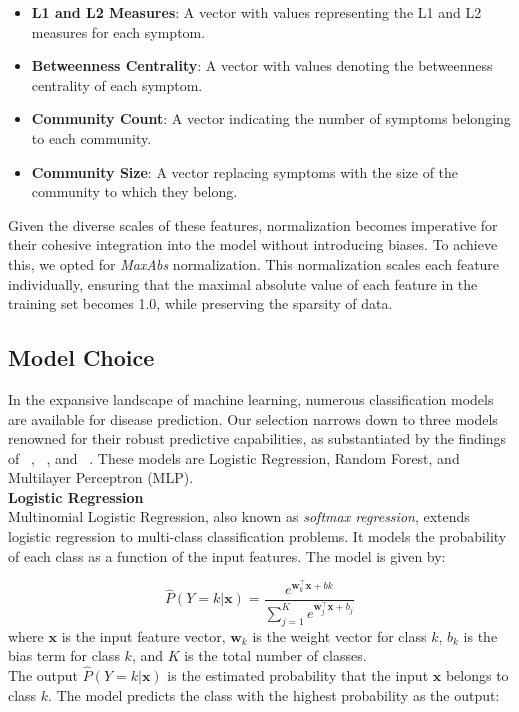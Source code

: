 \begin{itemize}
	\setlength\itemsep{1em} %
	\item \textbf{L1 and L2 Measures}: A vector with values representing the L1 and L2 measures for each symptom.
	\item \textbf{Betweenness Centrality}: A vector with values denoting the betweenness centrality of each symptom.
	\item \textbf{Community Count}: A vector indicating the number of symptoms belonging to each community.
	\item \textbf{Community Size}: A vector replacing symptoms with the size of the community to which they belong.
\end{itemize}
\noindent
Given the diverse scales of these features, normalization becomes imperative for their cohesive integration into the model
without introducing biases. To achieve this, we opted for \textit{MaxAbs} normalization. This normalization scales each feature
individually, ensuring that the maximal absolute value of each feature in the training set becomes 1.0, while preserving the sparsity of data.



\subsection{Model Choice}

In the expansive landscape of machine learning, numerous classification models are available for disease prediction.
Our selection narrows down to three models renowned for their robust predictive capabilities,
as substantiated by the findings of \citeauthor{Kohli}~\cite{Kohli}, \citeauthor{Singh}~\cite{Singh}, and \citeauthor{Uddin2019Dec}~\cite{Uddin2019Dec}.
These models are Logistic Regression, Random Forest, and Multilayer Perceptron (MLP).\\

\vspace{0.3cm}
\noindent
\textbf{Logistic Regression}\vspace{0.15cm}\\
Multinomial Logistic Regression, also known as \textit{softmax regression}, extends logistic regression to multi-class classification problems. It models the probability of each class as a function of the input features. The model is given by:

\begin{equation}
    \hat{P}(Y = k | \mathbf{x}) = \frac{e^{\mathbf{w}_k^\top \mathbf{x} + bk}}{\sum_{j=1}^{K} e^{\mathbf{w}_j^\top \mathbf{x} + b_j}}
\end{equation}
\noindent
where $\mathbf{x}$ is the input feature vector, $\mathbf{w}_k$ is the weight vector for class $k$, $b_k$ is the bias term for class $k$, and $K$ is the total number of classes.\\
The output $\hat{P}(Y = k | \mathbf{x})$ is the estimated probability that the input $\mathbf{x}$ belongs to class $k$. The model predicts the class with the highest probability as the output:

